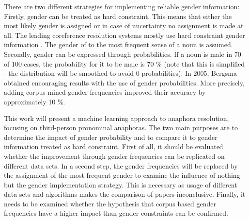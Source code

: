 There are two different strategies for implementing reliable gender information: \\
Firstly, gender can be treated as hard constraint. This means that either the most likely gender is assigned or in case of uncertainty no assignment is made at all. The leading coreference resolution systems mostly use hard constraint gender information \citep{soon2001machine}. The gender of to the most frequent sense of a noun is assumed.\\
Secondly, gender can be expressed through probabilities. If a noun is male in 70 of 100 cases, the probability for it to be male is 70 \% (note that this is simplified - the distribution will be smoothed to avoid 0-probabilities). In \nocite{bergsma2005automatic} 2005, Bergsma obtained encouraging results with the use of gender probabilities. More precisely, adding corpus mined gender frequencies improved their accuracy by approximately 10 \%.

This work will present a machine learning approach to anaphora resolution, focusing on third-person pronominal anaphoras. The two main purposes are to determine the impact of gender probability and to compare it to gender information treated as hard constraint. First of all, it should be evaluated whether the improvement through gender frequencies can be replicated on different data sets. In a second step, the gender frequencies will be replaced by the assignment of the most frequent gender to examine the influence of nothing but the gender implementation strategy. This is necessary as usage of different data sets and algorithms makes the comparison of papers inconclusive. Finally, it needs to be examined whether the hypothesis that corpus based gender frequencies have a higher impact than gender constraints can be confirmed.




